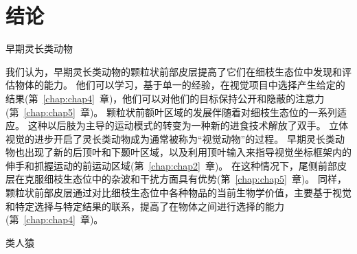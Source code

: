 \section{结论}

早期灵长类动物

我们认为，早期灵长类动物的颗粒状前部皮层提高了它们在细枝生态位中发现和评估物体的能力。
他们可以学习，基于单一的经验，在视觉项目中选择产生给定的结果(第~\ref{chap:chap4}~章)，他们可以对他们的目标保持公开和隐蔽的注意力(第~\ref{chap:chap5}~章)。
颗粒状前额叶区域的发展伴随着对细枝生态位的一系列适应。
这种以后肢为主导的运动模式的转变为一种新的进食技术解放了双手。
立体视觉的进步开启了灵长类动物成为通常被称为“视觉动物”的过程。
早期灵长类动物也出现了新的后顶叶和下颞叶区域，以及利用顶叶输入来指导视觉坐标框架内的伸手和抓握运动的前运动区域(第~\ref{chap:chap2}~章)。
在这种情况下，尾侧前部皮层在克服细枝生态位中的杂波和干扰方面具有优势(第~\ref{chap:chap5}~章)。
同样，颗粒状前部皮层通过对比细枝生态位中各种物品的当前生物学价值，主要基于视觉和特定选择与特定结果的联系，提高了在物体之间进行选择的能力(第~\ref{chap:chap4}~章)。


类人猿

